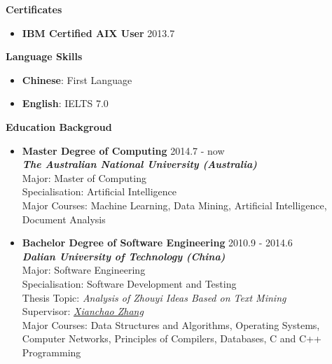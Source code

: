 \documentclass{res}
\newcommand{\resheading}[1]{{\normalsize \colorbox{mygrey}{\begin{minipage}{\textwidth}{\textbf{#1 \vphantom{p\^{E}}}}\end{minipage}}}}
\begin{document}
\begin{resume}
\begin{CJK*}{UTF8}{song}
\begin{itemize}
\end{itemize}



\resheading{Certificates}

\begin{itemize}
\itemsep -2pt %
  \item{\bf IBM Certified AIX User} \hfill 2013.7
\end{itemize}



\resheading{Language Skills}

\begin{itemize}
\itemsep -2pt %
  \item{\bf Chinese}: First Language	
  \item{\bf English}: IELTS 7.0
\end{itemize}






\resheading{Education Backgroud}

\begin{itemize}
  \item{\bf Master Degree of Computing} \hfill 2014.7 - now \\
  					  \textbf{\textit{The Australian National University (Australia)}} \\
                      Major: Master of Computing \\
                      Specialisation: Artificial Intelligence \\
                      Major Courses: Machine Learning, Data Mining, Artificial Intelligence, Document Analysis
  \item{\bf Bachelor Degree of Software Engineering}   \hfill 2010.9 - 2014.6 \\
  \textbf{\textit{Dalian University of Technology (China)}} \\
                      Major: Software Engineering\\
                      Specialisation: Software Development and Testing \\
                      Thesis Topic: \textit{Analysis of Zhouyi Ideas Based on Text Mining} \\
                      Supervisor: \href{https://sciforschenonline.org/journals/computer-science-informatics/xianchao-zhang.php}{\textit{Xianchao Zhang}} \\
                      Major Courses: Data Structures and Algorithms, Operating Systems, Computer Networks, Principles of Compilers, Databases, C and C++ Programming
\end{itemize}



\end{CJK*}
\end{resume}
\end{document}
